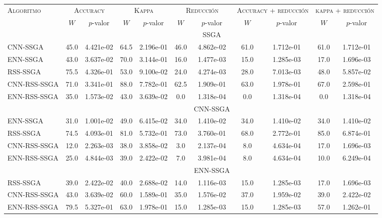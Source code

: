 \begin{table}[]
\centering
\begin{adjustbox}{max width =\textwidth}
\begin{tabular}{l c c c c c c c c c c}
\hline
\multirow{2}{*}{\textsc{Algoritmo}}
	& \multicolumn{2}{c}{\textsc{Accuracy}}
	& \multicolumn{2}{c}{\textsc{Kappa}}
	& \multicolumn{2}{c}{\textsc{Reducción}} 
	& \multicolumn{2}{c}{\textsc{Accuracy + reducción}} 
	& \multicolumn{2}{c}{\textsc{kappa + reducción}} \\
 & $W$ & $p$-valor & $W$ & $p$-valor & $W$ & $p$-valor & $W$ & $p$-valor & $W$ & $p$-valor \\
\hline
\hline

 & & & & & & SSGA & & & & \\

CNN-SSGA  & 45.0 & 4.421e-02 & 64.5 & 2.196e-01 & 46.0 & 4.862e-02 & 61.0 & 1.712e-01 & 61.0 & 1.712e-01 \\ 
ENN-SSGA & 43.0 & 3.637e-02 & 70.0 & 3.144e-01 & 16.0 & 1.477e-03 & 15.0 & 1.285e-03 & 17.0 & 1.696e-03 \\ 
RSS-SSGA  & 75.5 & 4.326e-01 & 53.0 & 9.100e-02 & 24.0 & 4.274e-03 & 28.0 & 7.013e-03 & 48.0 & 5.857e-02 \\ 
CNN-RSS-SSGA  & 71.0 & 3.341e-01 & 88.0 & 7.782e-01 & 62.5 & 1.909e-01 & 63.0 & 1.978e-01 & 67.0 & 2.598e-01 \\ 
ENN-RSS-SSGA & 35.0 & 1.573e-02 & 43.0 & 3.639e-02 & 0.0 & 1.318e-04 & 0.0 & 1.318e-04 & 0.0 & 1.318e-04 \\

\hline

 & & & & & & CNN-SSGA & & & & \\
ENN-SSGA  & 31.0 & 1.001e-02 & 49.0 & 6.415e-02 & 34.0 & 1.410e-02 & 34.0 & 1.410e-02 & 34.0 & 1.410e-02 \\ 
RSS-SSGA   & 74.5 & 4.093e-01 & 81.0 & 5.732e-01 & 73.0 & 3.760e-01 & 68.0 & 2.772e-01 & 85.0 & 6.874e-01 \\ 
CNN-RSS-SSGA  & 12.0 & 2.263e-03 & 38.0 & 3.858e-02 & 3.0 & 2.137e-04 & 8.0 & 4.634e-04 & 17.0 & 1.696e-03 \\ 
ENN-RSS-SSGA & 25.0 & 4.844e-03 & 39.0 & 2.422e-02 & 7.0 & 3.981e-04 & 8.0 & 4.634e-04 & 10.0 & 6.249e-04 \\ 

\hline

 & & & & & & ENN-SSGA & & & & \\
RSS-SSGA  & 39.0 & 2.422e-02 & 40.0 & 2.688e-02 & 14.0 & 1.116e-03 & 15.0 & 1.285e-03 & 17.0 & 1.696e-03 \\ 
CNN-RSS-SSGA  & 43.0 & 3.639e-02 & 60.0 & 1.589e-01 & 35.0 & 1.576e-02 & 37.0 & 1.959e-02 & 39.0 & 2.422e-02 \\ 
ENN-RSS-SSGA & 79.5 & 5.327e-01 & 63.0 & 1.978e-01 & 15.0 & 1.285e-03 & 15.0 & 1.285e-03 & 57.0 & 1.262e-01 \\


\end{tabular}
\end{adjustbox}
\end{table}
